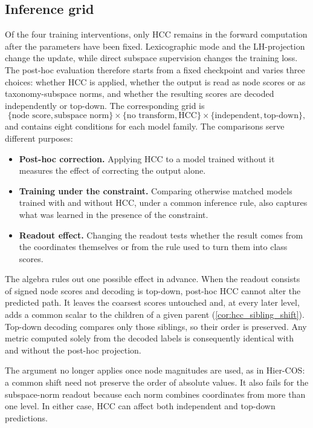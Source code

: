 \subsection{Inference grid}
\label{ssec:inference_grid}
\label{ssec:inference_interaction}

Of the four training interventions, only HCC remains in the forward computation
after the parameters have been fixed. Lexicographic mode and the LH-projection
change the update, while direct subspace supervision changes the training loss.
The post-hoc evaluation therefore starts from a fixed checkpoint and varies
three choices:
whether HCC is applied, whether the output is read as node scores or as
taxonomy-subspace norms, and whether the resulting scores are decoded
independently or top-down. The corresponding grid is
\[
\{\text{node score},\text{subspace norm}\}
\times\{\text{no transform},\text{HCC}\}
\times\{\text{independent},\text{top-down}\},
\]
and contains eight conditions for each model family. The comparisons serve
different purposes:

\begin{itemize}
    \item \textbf{Post-hoc correction.} Applying HCC to a model trained without
          it measures the effect of correcting the output alone.
    \item \textbf{Training under the constraint.} Comparing otherwise matched
          models trained with and without HCC, under a common inference rule,
          also captures what was learned in the presence of the constraint.
    \item \textbf{Readout effect.} Changing the readout tests whether the result
          comes from the coordinates themselves or from the rule used to turn
          them into class scores.
\end{itemize}

The algebra rules out one possible effect in advance. When the readout consists
of signed node scores and decoding is top-down, post-hoc HCC cannot alter the
predicted path. It leaves the coarsest scores untouched and, at every later
level, adds a common scalar to the children of a given parent
(\cref{cor:hcc_sibling_shift}). Top-down decoding compares only those siblings,
so their order is preserved. Any metric computed solely from the decoded labels
is consequently identical with and without the post-hoc projection.

The argument no longer applies once node magnitudes are used, as in Hier-COS: a
common shift need not preserve the order of absolute values. It also fails for
the subspace-norm readout because each norm combines coordinates from more than
one level. In either case, HCC can affect both independent and top-down
predictions.


